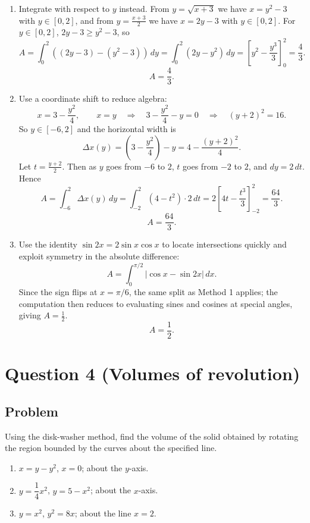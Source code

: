 \documentclass[12pt]{article}
\begin{document}
\begin{enumerate}[label=(\alph*)]
\item Integrate with respect to \(y\) instead.
From \(y=\sqrt{x+3}\) we have \(x=y^2-3\) with \(y\in[0,2]\), and from \(y=\frac{x+3}{2}\) we have \(x=2y-3\) with \(y\in[0,2]\).
For \(y\in[0,2]\), \(2y-3 \ge y^2-3\), so
\[
A=\int_{0}^{2}\left((2y-3)-(y^2-3)\right)\,dy
=\int_{0}^{2}(2y-y^2)\,dy
=\left[y^2-\frac{y^3}{3}\right]_{0}^{2}
=\frac{4}{3}.
\]
\[
\boxed{A=\frac{4}{3}.}
\]

\item Use a coordinate shift to reduce algebra:
\[
x=3-\frac{y^2}{4},\qquad x=y
\quad\Rightarrow\quad
3-\frac{y^2}{4}-y = 0
\quad\Rightarrow\quad
\left(y+2\right)^2 = 16.
\]
So \(y\in[-6,2]\) and the horizontal width is
\[
\Delta x(y) = \left(3-\frac{y^2}{4}\right)-y
= 4-\frac{(y+2)^2}{4}.
\]
Let \(t=\frac{y+2}{2}\). Then as \(y\) goes from \(-6\) to \(2\), \(t\) goes from \(-2\) to \(2\), and \(dy=2\,dt\). Hence
\[
A=\int_{-6}^{2}\Delta x(y)\,dy
=\int_{-2}^{2}\left(4-t^2\right)\cdot 2\,dt
=2\left[4t-\frac{t^3}{3}\right]_{-2}^{2}
=\frac{64}{3}.
\]
\[
\boxed{A=\frac{64}{3}.}
\]

\item Use the identity \(\sin 2x = 2\sin x\cos x\) to locate intersections quickly and exploit symmetry in the absolute difference:
\[
A=\int_{0}^{\pi/2}\left|\cos x-\sin 2x\right|\,dx.
\]
Since the sign flips at \(x=\pi/6\), the same split as Method 1 applies; the computation then reduces to evaluating sines and cosines at special angles, giving \(A=\frac12\).
\[
\boxed{A=\frac12.}
\]
\end{enumerate}

\newpage


\section*{Question 4 (Volumes of revolution)}

\subsection*{Problem}
Using the disk-washer method, find the volume of the solid obtained by rotating the region bounded by the curves about the specified line.
\begin{enumerate}[label=(\alph*)]
\item \(x=y-y^2\), \(x=0\); about the \(y\)-axis.
\item \(y=\dfrac{1}{4}x^2\), \(y=5-x^2\); about the \(x\)-axis.
\item \(y=x^2\), \(y^2=8x\); about the line \(x=2\).
\end{enumerate}
\end{document}
